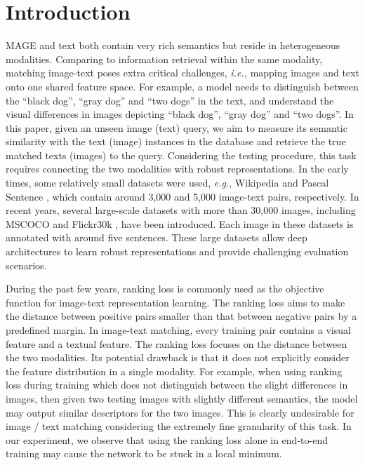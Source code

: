 \documentclass[10pt,final,journal]{IEEEtran}
\newcommand{\eg}{\mbox{\emph{e.g.}}}
\begin{document}
\maketitle

\IEEEdisplaynotcompsoctitleabstractindextext

\IEEEpeerreviewmaketitle

\section{Introduction}
MAGE and text both contain very rich semantics but reside in heterogeneous modalities. Comparing to information retrieval within the same modality, matching image-text poses extra critical challenges, \emph{i.e.,} mapping images and text onto one shared feature space. For example, a model needs to distinguish between the ``black dog'', ``gray dog'' and ``two dogs'' in the text, and understand the visual differences in images depicting ``black dog'', ``gray dog'' and ``two dogs''. In this paper, given an unseen image (text) query, we aim to measure its semantic similarity with the text (image) instances in the database and retrieve the true matched texts (images) to the query. Considering the testing procedure, this task requires connecting the two modalities with robust representations. In the early times, some relatively small datasets were used, \eg, Wikipedia \cite{rasiwasia2010new} and Pascal Sentence \cite{rashtchian2010collecting}, which contain around 3,000 and 5,000 image-text pairs, respectively. In recent years, several large-scale datasets with more than 30,000 images, including MSCOCO \cite{lin2014microsoft} and Flickr30k \cite{young2014image}, have been introduced. Each image in these datasets is annotated with around five sentences.  These large datasets allow deep architectures to learn robust representations and provide challenging evaluation scenarios. 





During the past few years,  ranking loss is commonly used as the objective function \cite{frome2013devise,karpathy2014deep,ma2015multimodal,wang2016learning,nam2016dual,reed2016learning} for image-text representation learning. The ranking loss aims to make the distance between positive pairs smaller than that between negative pairs by a predefined margin. 
In image-text matching, every training pair contains a visual feature and a textual feature.
The ranking loss focuses on the distance between the two modalities. Its potential drawback is that it does not explicitly consider the feature distribution in a single modality. 
For example, when using ranking loss during training which does not distinguish between the slight differences in images, then given two testing images with slightly different semantics, the model may output similar descriptors for the two images. This is clearly undesirable for image / text matching considering the extremely fine granularity of this task. In our experiment, we observe that using the ranking loss alone in end-to-end training may cause the network to be stuck in a local minimum.
\end{document}
